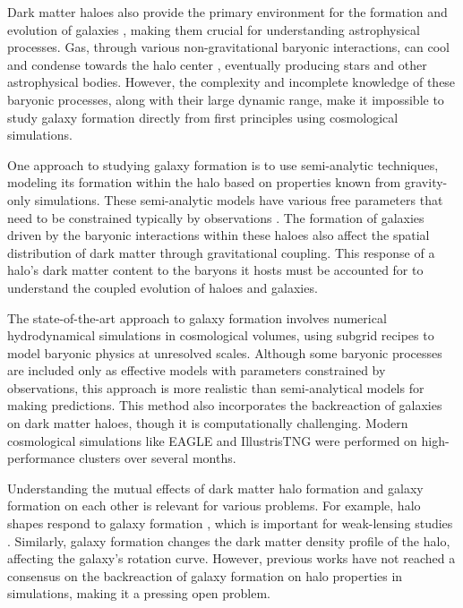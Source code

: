 \documentclass[a4paper, 12pt, oneside]{Thesis}  %
\begin{document}
Dark matter haloes also provide the primary environment for the formation and evolution of galaxies \citep[][]{wr78}, making them crucial for understanding astrophysical processes. Gas, through various non-gravitational baryonic interactions, can cool and condense towards the halo center \citep{1988MNRAS.234..459S,1998MNRAS.295..319M}, eventually producing stars and other astrophysical bodies. However, the complexity and incomplete knowledge of these baryonic processes, along with their large dynamic range, make it impossible to study galaxy formation directly from first principles using cosmological simulations.

One approach to studying galaxy formation is to use semi-analytic techniques, modeling its formation within the halo based on properties known from gravity-only simulations. These semi-analytic models have various free parameters that need to be constrained typically by observations \citep{2015ARA&A..53...51S}. The formation of galaxies driven by the baryonic interactions within these haloes also affect the spatial distribution of dark matter through gravitational coupling. This response of a halo's dark matter content to the baryons it hosts must be accounted for to understand the coupled evolution of haloes and galaxies.

The state-of-the-art approach to galaxy formation involves numerical hydrodynamical simulations in cosmological volumes, using subgrid recipes to model baryonic physics at unresolved scales. Although some baryonic processes are included only as effective models with parameters constrained by observations, this approach is more realistic than semi-analytical models for making predictions. This method also incorporates the backreaction of galaxies on dark matter haloes, though it is computationally challenging. Modern cosmological simulations like EAGLE \citep{2015Schaye_EAGLE} and IllustrisTNG \citep{2018MNRAS.480.5113M} were performed on high-performance clusters over several months.

Understanding the mutual effects of dark matter halo formation and galaxy formation on each other is relevant for various problems. For example, halo shapes respond to galaxy formation \citep{2010MNRAS.407..435A,2021MNRAS.501.5679C}, which is important for weak-lensing studies \citep{2021A&A...647A.185G}. Similarly, galaxy formation changes the dark matter density profile of the halo, affecting the galaxy's rotation curve. However, previous works have not reached a consensus on the backreaction of galaxy formation on halo properties in simulations, making it a pressing open problem.
\end{document}
